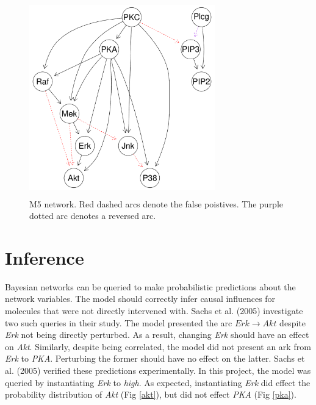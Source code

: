 \documentclass[twocol]{ametsoc}
\begin{document}
\begin{figure}[h]
 \centerline{\includegraphics[width = 19pc, height = 20pc]{images/final_net.pdf}}
  \caption{M5 network. Red dashed arcs denote the false poistives. The purple dotted arc denotes a reversed arc.}\label{M5}
\end{figure}

\hypertarget{inference}{%
\section{Inference}\label{inference}}

Bayesian networks can be queried to make probabilistic predictions about
the network variables. The model should correctly infer causal
influences for molecules that were not directly intervened with. Sachs
et al. (2005) investigate two such queries in their study. The model
presented the arc \(Erk \to Akt\) despite \emph{Erk} not being directly
perturbed. As a result, changing \emph{Erk} should have an effect on
\emph{Akt}. Similarly, despite being correlated, the model did not
present an ark from \emph{Erk} to \emph{PKA}. Perturbing the former
should have no effect on the latter. Sachs et al. (2005) verified these
predictions experimentally. In this project, the model was queried by
instantiating \emph{Erk} to \emph{high}. As expected, instantiating
\emph{Erk} did effect the probability distribution of \emph{Akt} (Fig
\ref{akt}), but did not effect \emph{PKA} (Fig \ref{pka}).
\end{document}
